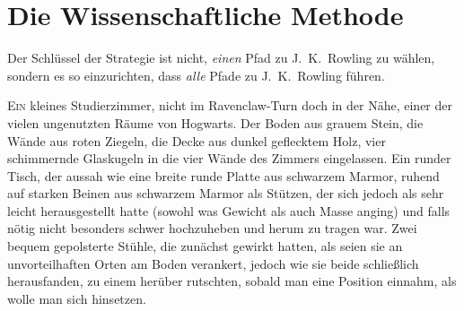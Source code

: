 \chapter{Die Wissenschaftliche Methode}

\begin{chapterOpeningAuthorNote}
Der Schlüssel der Strategie ist nicht, \emph{einen} Pfad zu J.~K.~Rowling zu wählen, sondern es so einzurichten, dass \emph{alle} Pfade zu J.~K.~Rowling führen.
\end{chapterOpeningAuthorNote}

\lettrine{E}{in} kleines Studierzimmer, nicht im Ravenclaw-Turn doch in der Nähe, einer der vielen ungenutzten Räume von Hogwarts. Der Boden aus grauem Stein, die Wände aus roten Ziegeln, die Decke aus dunkel geflecktem Holz, vier schimmernde Glaskugeln in die vier Wände des Zimmers eingelassen. Ein runder Tisch, der aussah wie eine breite runde Platte aus schwarzem Marmor, ruhend auf starken Beinen aus schwarzem Marmor als Stützen, der sich jedoch als sehr leicht herausgestellt hatte (sowohl was Gewicht als auch Masse anging) und falls nötig nicht besonders schwer hochzuheben und herum zu tragen war. Zwei bequem gepolsterte Stühle, die zunächst gewirkt hatten, als seien sie an unvorteilhaften Orten am Boden verankert, jedoch wie sie beide schließlich herausfanden, zu einem herüber rutschten, sobald man eine Position einnahm, als wolle man sich hinsetzen.

